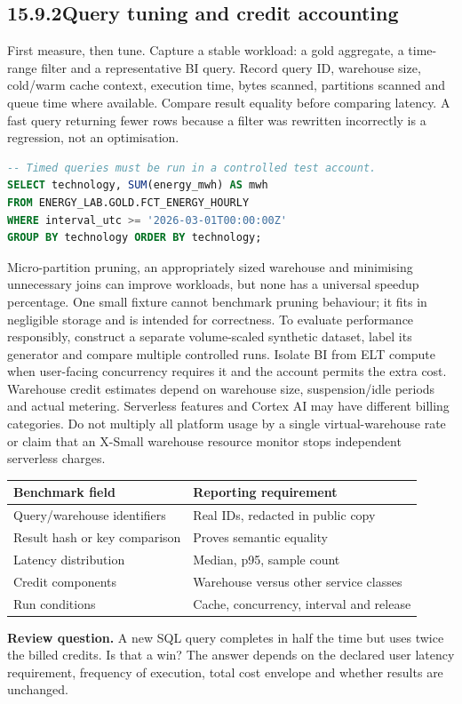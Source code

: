 \documentclass[11pt,twoside]{article}
\newcommand{\topic}[2]{\subsection*{#1\quad #2}}
\begin{document}
\newpage

\topic{15.9.2}{Query tuning and credit accounting}
First measure, then tune. Capture a stable workload: a gold aggregate, a time-range filter and a representative BI query. Record query ID, warehouse size, cold/warm cache context, execution time, bytes scanned, partitions scanned and queue time where available. Compare result equality before comparing latency. A fast query returning fewer rows because a filter was rewritten incorrectly is a regression, not an optimisation.
\begin{lstlisting}[language=SQL]
-- Timed queries must be run in a controlled test account.
SELECT technology, SUM(energy_mwh) AS mwh
FROM ENERGY_LAB.GOLD.FCT_ENERGY_HOURLY
WHERE interval_utc >= '2026-03-01T00:00:00Z'
GROUP BY technology ORDER BY technology;
\end{lstlisting}
Micro-partition pruning, an appropriately sized warehouse and minimising unnecessary joins can improve workloads, but none has a universal speedup percentage. One small fixture cannot benchmark pruning behaviour; it fits in negligible storage and is intended for correctness. To evaluate performance responsibly, construct a separate volume-scaled synthetic dataset, label its generator and compare multiple controlled runs. Isolate BI from ELT compute when user-facing concurrency requires it and the account permits the extra cost.
Warehouse credit estimates depend on warehouse size, suspension/idle periods and actual metering. Serverless features and Cortex AI may have different billing categories. Do not multiply all platform usage by a single virtual-warehouse rate or claim that an X-Small warehouse resource monitor stops independent serverless charges.
\begin{center}\small\begin{tabularx}{\linewidth}{@{}p{37mm}X@{}}\toprule
Benchmark field & Reporting requirement\\\midrule
Query/warehouse identifiers & Real IDs, redacted in public copy\\
Result hash or key comparison & Proves semantic equality\\
Latency distribution & Median, p95, sample count\\
Credit components & Warehouse versus other service classes\\
Run conditions & Cache, concurrency, interval and release\\\bottomrule\end{tabularx}\end{center}
\textbf{Review question.} A new SQL query completes in half the time but uses twice the billed credits. Is that a win? The answer depends on the declared user latency requirement, frequency of execution, total cost envelope and whether results are unchanged.
\end{document}
